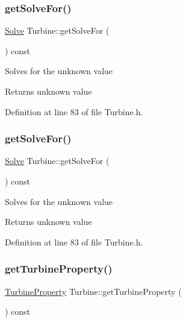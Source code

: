\subsubsection{\texorpdfstring{get\+Solve\+For()}{getSolveFor()}\hspace{0.1cm}{\footnotesize\ttfamily [2/3]}}
{\footnotesize\ttfamily \hyperlink{class_turbine_a9fd7beba6c6f071e228fbe3e07969d2b}{Solve} Turbine\+::get\+Solve\+For (\begin{DoxyParamCaption}{ }\end{DoxyParamCaption}) const\hspace{0.3cm}{\ttfamily [inline]}}

Solves for the unknown value

\begin{DoxyReturn}{Returns}
unknown value 
\end{DoxyReturn}


Definition at line 83 of file Turbine.\+h.

\mbox{\label{class_turbine_a58c73057a4b890eab2af2b42c82484e6}} 
\subsubsection{\texorpdfstring{get\+Solve\+For()}{getSolveFor()}\hspace{0.1cm}{\footnotesize\ttfamily [3/3]}}
{\footnotesize\ttfamily \hyperlink{class_turbine_a9fd7beba6c6f071e228fbe3e07969d2b}{Solve} Turbine\+::get\+Solve\+For (\begin{DoxyParamCaption}{ }\end{DoxyParamCaption}) const\hspace{0.3cm}{\ttfamily [inline]}}

Solves for the unknown value

\begin{DoxyReturn}{Returns}
unknown value 
\end{DoxyReturn}


Definition at line 83 of file Turbine.\+h.

\mbox{\label{class_turbine_a14f6eff49b501aa8c5a22d404dbeaac0}} 
\subsubsection{\texorpdfstring{get\+Turbine\+Property()}{getTurbineProperty()}\hspace{0.1cm}{\footnotesize\ttfamily [1/3]}}
{\footnotesize\ttfamily \hyperlink{class_turbine_a5db4f65cf2539e3837684d53221ade12}{Turbine\+Property} Turbine\+::get\+Turbine\+Property (\begin{DoxyParamCaption}{ }\end{DoxyParamCaption}) const\hspace{0.3cm}{\ttfamily [inline]}}

